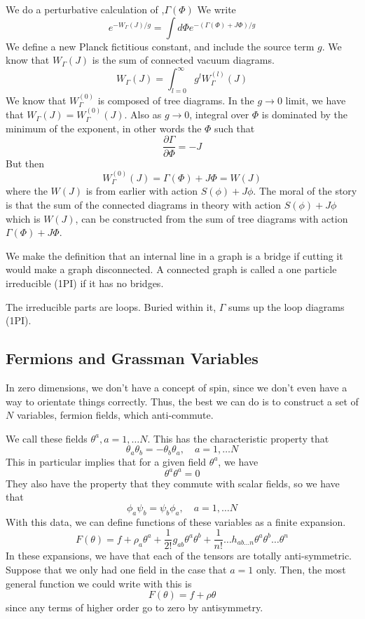 \documentclass[11pt, oneside]{article}   	%
\theoremstyle{slanted}
\begin{document}
We do a perturbative calculation of ,$ \Gamma \left(  \Phi   \right) $
We write 
\[
e ^{  - W _{ \Gamma } \left( J  \right)   / g }  = \int d \Phi e ^{ 
- \left( \Gamma \left(  \Phi  \right)   + J \Phi  \right)   / g } 
\] We define a new Planck fictitious constant, 
and include the source term $ g $. 
We know that 
$ W _{ \Gamma } \left(  J  \right)  $ is the 
sum of connected vacuum diagrams. 
\[
W _{\Gamma }\left( J  \right) 
= \int_{ l  =0 } ^{ \infty } g ^ l W _{ \Gamma } ^{ \left(  l  \right)   } 
\left( J  \right) 
\]  We know that 
$ W  _{ \Gamma } ^{ \left(  0  \right)   }$ 
is composed of tree diagrams. 
In the $ g \to 0 $ limit, 
we have that $ W_{ \Gamma } \left( J  \right)    =  W_{ \Gamma } ^{ \left(  0  \right)  } 
\left( J  \right)  $. 
Also as $ g \to 0 $, integral over $ \Phi $ is 
dominated by the minimum of the exponent, 
in other words the $ \Phi $ such that 
\[
\frac{\partial  \Gamma }{\partial  \Phi }   =  - J 
\]  But then 
\[
W _{ \Gamma } ^{ \left(  0  \right)  } \left(  J \right)   = 
\Gamma ( \Phi ) + J \Phi  = W \left( J  \right)  
\] where the $ W ( J ) $ is from earlier 
with action  $ S ( \phi  )  + J \phi  $. 
The moral of the 
story is that the sum of the connected diagrams 
in theory with action $ S( \phi  ) + J \phi  $ 
which is  $ W( J  )  $, can 
be constructed from the sum of tree diagrams with action  $ \Gamma \left( \Phi  \right)  
+ J \Phi $.

We make the definition that an internal line in  a graph 
is a bridge if cutting it 
would make a graph disconnected. 
A connected graph is called a 
one particle irreducible (1PI)
if it has no bridges. 

The irreducible parts are loops. 
Buried within it, 
$ \Gamma $ sums up the loop diagrams (1PI). 

\subsection{Fermions and Grassman Variables}
In zero dimensions, 
we don't have a concept of spin, 
since we don't even have a way to 
orientate things correctly. 
Thus, the best we can do is 
to construct a set of $ N $ variables, 
fermion fields, which anti-commute. 

We call these fields $ \theta ^ a , a  = 1, \dots N $. 
This has the characteristic property that 
\[
\theta_ a \theta _ b  =  - \theta_ b \theta _ a , \quad a = 1 , \dots N 
\] 
This in particular implies that 
for a given field $ \theta ^ a $, we have 
\[
\theta ^ a \theta ^ a  =0
\] They also 
have the property that they commute with 
scalar fields, 
so we have that 
\[
\phi _ a \psi _ b  = \psi _ b \phi _ a , \quad a = 1 , \dots N 
\] 
With this data, we can define functions 
of these variables as a finite expansion.  
\[
F \left( \theta  \right)  = f + \rho _ a \theta ^ a 	
+ \frac{1}{2 ! }g _{ ab } \theta ^a \theta ^ b + \frac{1}{n ! }\dots h_{ ab \dots n } \theta ^ a \theta ^ b 
\dots \theta ^ n 
\] In these 
expansions, we have that each of the 
tensors are totally anti-symmetric.
Suppose that we only had one field 
in the case that $ a = 1 $ only. 
Then, the most 
general function we could write with this is 
\[
F \left( \theta  \right)   = f + \rho \theta 
\] since any terms of higher order 
go to zero by antisymmetry. 
\end{document}
